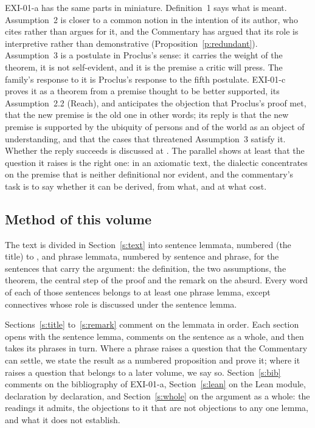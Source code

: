 EXI-01-a has the same parts in miniature. Definition~1 says what is meant. Assumption~2 is closer to a common notion in the intention of its author, who cites rather than argues for it, and the Commentary has argued that its role is interpretive rather than demonstrative (Proposition~\ref{p:redundant}). Assumption~3 is a postulate in Proclus's sense: it carries the weight of the theorem, it is not self-evident, and it is the premise a critic will press. The family's response to it is Proclus's response to the fifth postulate. EXI-01-c proves it as a theorem from a premise thought to be better supported, its Assumption~2.2 (Reach), and anticipates the objection that Proclus's proof met, that the new premise is the old one in other words; its reply is that the new premise is supported by the ubiquity of persons and of the world as an object of understanding, and that the cases that threatened Assumption~3 satisfy it. Whether the reply succeeds is discussed at . The parallel shows at least that the question it raises is the right one: in an axiomatic text, the dialectic concentrates on the premise that is neither definitional nor evident, and the commentary's task is to say whether it can be derived, from what, and at what cost.

\subsection{Method of this volume}

The text is divided in Section~\ref{s:text} into \cnSentLemmata{} sentence lemmata, numbered  (the title) to , and \cnPhraseLemmata{} phrase lemmata, numbered by sentence and phrase, for the sentences that carry the argument: the definition, the two assumptions, the theorem, the central step of the proof and the remark on the absurd. Every word of each of those sentences belongs to at least one phrase lemma, except connectives whose role is discussed under the sentence lemma.

Sections~\ref{s:title} to~\ref{s:remark} comment on the lemmata in order. Each section opens with the sentence lemma, comments on the sentence as a whole, and then takes its phrases in turn. Where a phrase raises a question that the Commentary can settle, we state the result as a numbered proposition and prove it; where it raises a question that belongs to a later volume, we say so. Section~\ref{s:bib} comments on the bibliography of EXI-01-a, Section~\ref{s:lean} on the Lean module, declaration by declaration, and Section~\ref{s:whole} on the argument as a whole: the readings it admits, the objections to it that are not objections to any one lemma, and what it does not establish.


